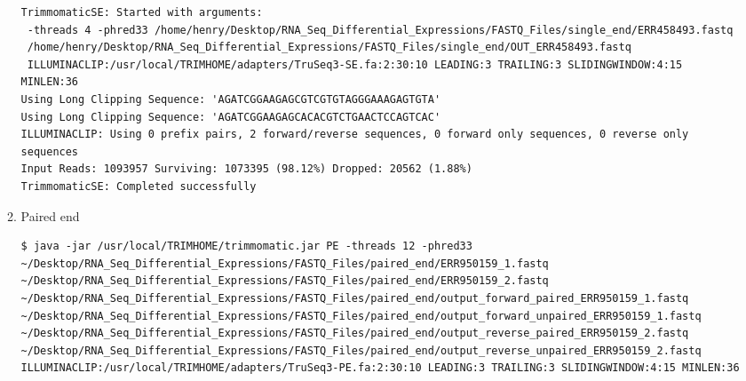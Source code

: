 \documentclass{article}
\begin{document}
\begin{itemize}
\begin{enumerate}
\begin{verbatim}
TrimmomaticSE: Started with arguments:
 -threads 4 -phred33 /home/henry/Desktop/RNA_Seq_Differential_Expressions/FASTQ_Files/single_end/ERR458493.fastq 
 /home/henry/Desktop/RNA_Seq_Differential_Expressions/FASTQ_Files/single_end/OUT_ERR458493.fastq 
 ILLUMINACLIP:/usr/local/TRIMHOME/adapters/TruSeq3-SE.fa:2:30:10 LEADING:3 TRAILING:3 SLIDINGWINDOW:4:15 MINLEN:36
Using Long Clipping Sequence: 'AGATCGGAAGAGCGTCGTGTAGGGAAAGAGTGTA'
Using Long Clipping Sequence: 'AGATCGGAAGAGCACACGTCTGAACTCCAGTCAC'
ILLUMINACLIP: Using 0 prefix pairs, 2 forward/reverse sequences, 0 forward only sequences, 0 reverse only sequences
Input Reads: 1093957 Surviving: 1073395 (98.12%) Dropped: 20562 (1.88%)
TrimmomaticSE: Completed successfully
\end{verbatim}
\normalsize
 \item Paired end
 \tiny 
\begin{verbatim}
$ java -jar /usr/local/TRIMHOME/trimmomatic.jar PE -threads 12 -phred33 
~/Desktop/RNA_Seq_Differential_Expressions/FASTQ_Files/paired_end/ERR950159_1.fastq 
~/Desktop/RNA_Seq_Differential_Expressions/FASTQ_Files/paired_end/ERR950159_2.fastq  
~/Desktop/RNA_Seq_Differential_Expressions/FASTQ_Files/paired_end/output_forward_paired_ERR950159_1.fastq 
~/Desktop/RNA_Seq_Differential_Expressions/FASTQ_Files/paired_end/output_forward_unpaired_ERR950159_1.fastq 
~/Desktop/RNA_Seq_Differential_Expressions/FASTQ_Files/paired_end/output_reverse_paired_ERR950159_2.fastq  
~/Desktop/RNA_Seq_Differential_Expressions/FASTQ_Files/paired_end/output_reverse_unpaired_ERR950159_2.fastq 
ILLUMINACLIP:/usr/local/TRIMHOME/adapters/TruSeq3-PE.fa:2:30:10 LEADING:3 TRAILING:3 SLIDINGWINDOW:4:15 MINLEN:36


\end{verbatim}
\end{enumerate}
\end{itemize}
\end{document}
